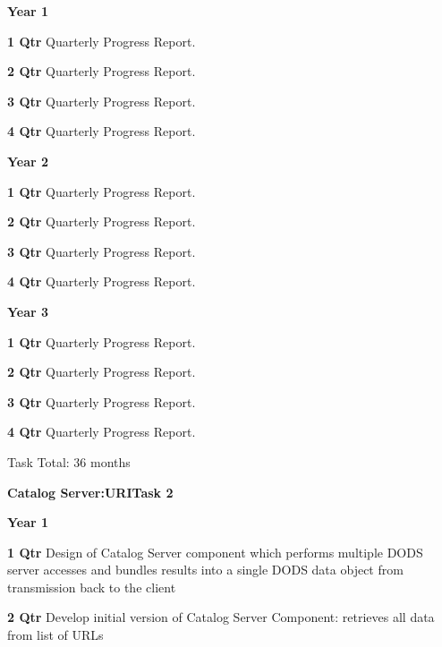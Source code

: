 \documentclass[12pt]{article}
\begin{document}
\begin{description}
 \item{\large \bf Year 1}
   \begin{description}
   \item{\bf 1 Qtr} Quarterly Progress Report.
   \item{\bf 2 Qtr} Quarterly Progress Report.
   \item{\bf 3 Qtr} Quarterly Progress Report.
   \item{\bf 4 Qtr} Quarterly Progress Report.
   \end{description}
 \item{\large \bf Year 2}
   \begin{description}
   \item{\bf 1 Qtr} Quarterly Progress Report.
   \item{\bf 2 Qtr} Quarterly Progress Report.
   \item{\bf 3 Qtr} Quarterly Progress Report.
   \item{\bf 4 Qtr} Quarterly Progress Report.
   \end{description}
 \item{\large \bf Year 3}
   \begin{description}
   \item{\bf 1 Qtr} Quarterly Progress Report.
   \item{\bf 2 Qtr} Quarterly Progress Report.
   \item{\bf 3 Qtr} Quarterly Progress Report.
   \item{\bf 4 Qtr} Quarterly Progress Report.  

Task Total: 36 months 

  \end{description}

\begin{center}
{\large \bf Catalog Server:URITask 2}
\end{center}

 \item{\large \bf Year 1}
   \begin{description}

   \item{\bf 1 Qtr} Design of Catalog Server component which performs
     multiple DODS server accesses and bundles results into a single DODS
     data object from transmission back to the client

   \item{\bf 2 Qtr} Develop initial version of Catalog Server Component:
     retrieves all data from list of URLs


\end{description}
\end{description}
\end{document}
